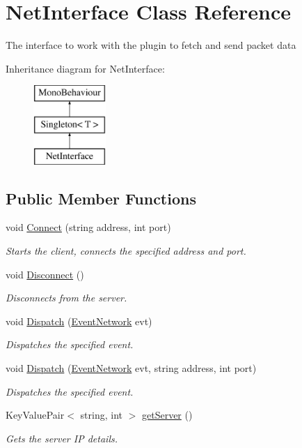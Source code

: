 \hypertarget{class_net_interface}{\section{Net\-Interface Class Reference}
\label{class_net_interface}
}


The interface to work with the plugin to fetch and send packet data  


Inheritance diagram for Net\-Interface\-:\begin{figure}[H]
\begin{center}
\leavevmode
\includegraphics[height=3.000000cm]{class_net_interface}
\end{center}
\end{figure}
\subsection*{Public Member Functions}
\begin{DoxyCompactItemize}
\item 
void \hyperlink{class_net_interface_a565fb35ea7ed5e364902aa8bd0bc6bf9}{Connect} (string address, int port)
\begin{DoxyCompactList}\small\item\em Starts the client, connects the specified address and port. \end{DoxyCompactList}\item 
void \hyperlink{class_net_interface_ae0be68e392f32d422325ac54fcaa7cae}{Disconnect} ()
\begin{DoxyCompactList}\small\item\em Disconnects from the server. \end{DoxyCompactList}\item 
void \hyperlink{class_net_interface_a3ed4f694a9f2083af9ea38ed2a554404}{Dispatch} (\hyperlink{class_event_network}{Event\-Network} evt)
\begin{DoxyCompactList}\small\item\em Dispatches the specified event. \end{DoxyCompactList}\item 
void \hyperlink{class_net_interface_a0cf4580da2218baff890af79fd606722}{Dispatch} (\hyperlink{class_event_network}{Event\-Network} evt, string address, int port)
\begin{DoxyCompactList}\small\item\em Dispatches the specified event. \end{DoxyCompactList}\item 
Key\-Value\-Pair$<$ string, int $>$ \hyperlink{class_net_interface_a18dfbf82b7c690b9abf4ae9ed9aaddcd}{get\-Server} ()
\begin{DoxyCompactList}\small\item\em Gets the server I\-P details. \end{DoxyCompactList}\end{DoxyCompactItemize}
